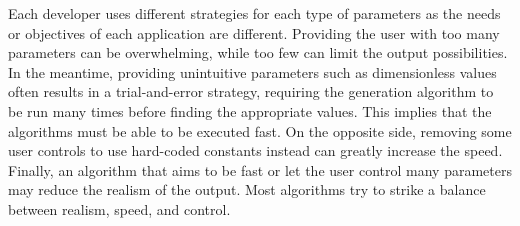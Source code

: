 

Each developer uses different strategies for each type of parameters as the needs or objectives of each application are different. Providing the user with too many parameters can be overwhelming, while too few can limit the output possibilities. In the meantime, providing unintuitive parameters such as dimensionless values often results in a trial-and-error strategy, requiring the generation algorithm to be run many times before finding the appropriate values. This implies that the algorithms must be able to be executed fast. On the opposite side, removing some user controls to use hard-coded constants instead can greatly increase the speed. Finally, an algorithm that aims to be fast or let the user control many parameters may reduce the realism of the output. Most algorithms try to strike a balance between realism, speed, and control.

